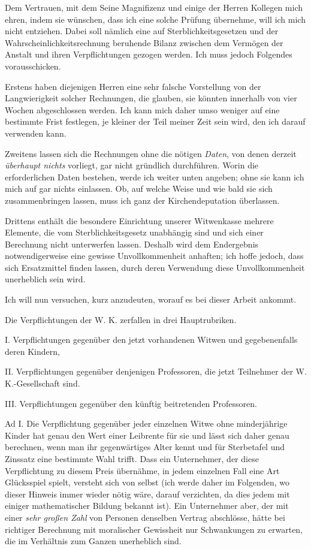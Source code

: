 Dem Vertrauen, mit dem Seine Magnifizenz und einige der Herren Kollegen mich ehren, indem sie wünschen, dass ich eine solche Prüfung übernehme, will ich mich nicht entziehen. Dabei soll nämlich eine auf Sterblichkeitsgesetzen und der Wahrscheinlichkeitsrechnung beruhende Bilanz zwischen dem Vermögen der Anstalt und ihren Verpflichtungen gezogen werden. Ich muss jedoch Folgendes vorausschicken.

Erstens haben diejenigen Herren eine sehr falsche Vorstellung von der Langwierigkeit solcher Rechnungen, die glauben, sie könnten innerhalb von vier Wochen abgeschlossen werden. Ich kann mich daher umso weniger auf eine bestimmte Frist festlegen, je kleiner der Teil meiner Zeit sein wird, den ich darauf verwenden kann.

Zweitens lassen sich die Rechnungen ohne die nötigen \textit{Daten}, von denen derzeit \textit{überhaupt nichts} vorliegt, gar nicht gründlich durchführen. Worin die erforderlichen Daten bestehen, werde ich weiter unten angeben; ohne sie kann ich mich auf gar nichts einlassen. Ob, auf welche Weise und wie bald sie sich zusammenbringen lassen, muss ich ganz der Kirchendeputation überlassen.

Drittens enthält die besondere Einrichtung unserer Witwenkasse mehrere Elemente, die vom Sterblichkeitsgesetz unabhängig sind und sich einer Berechnung nicht unterwerfen lassen. Deshalb wird dem Endergebnis notwendigerweise eine gewisse Unvollkommenheit anhaften; ich hoffe jedoch, dass sich Ersatzmittel finden lassen, durch deren Verwendung diese Unvollkommenheit unerheblich sein wird.

Ich will nun versuchen, kurz anzudeuten, worauf es bei dieser Arbeit ankommt.

\par{}
Die Verpflichtungen der W. K. zerfallen in drei Hauptrubriken.

I. Verpflichtungen gegenüber den jetzt vorhandenen Witwen und gegebenenfalls deren Kindern,

II. Verpflichtungen gegenüber denjenigen Professoren, die jetzt Teilnehmer der W. K.-Gesellschaft sind.

III. Verpflichtungen gegenüber den künftig beitretenden Professoren.

Ad I. Die Verpflichtung gegenüber jeder einzelnen Witwe ohne minderjährige Kinder hat genau den Wert einer Leibrente für sie und lässt sich daher genau berechnen, wenn man ihr gegenwärtiges Alter kennt und für Sterbetafel und Zinssatz eine bestimmte Wahl trifft. Dass ein Unternehmer, der diese Verpflichtung zu diesem Preis übernähme, in jedem einzelnen Fall eine Art Glücksspiel spielt, versteht sich von selbst (ich werde daher im Folgenden, wo dieser Hinweis immer wieder nötig wäre, darauf verzichten, da dies jedem mit einiger mathematischer Bildung bekannt ist). Ein Unternehmer aber, der mit einer \textit{sehr großen Zahl} von Personen denselben Vertrag abschlösse, hätte bei richtiger Berechnung mit moralischer Gewissheit nur Schwankungen zu erwarten, die im Verhältnis zum Ganzen unerheblich sind.

